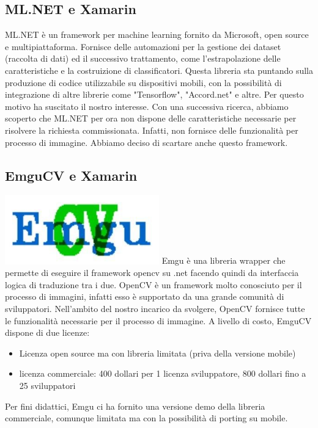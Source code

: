 \documentclass[twoside]{supsistudent}
\newcommand{\Decaa}{\newline\vspace{0.5mm}\newline\noindent}
\begin{document}
\subsection{ML.NET e Xamarin}
ML.NET è un framework per machine learning fornito da Microsoft, open source e multipiattaforma.
Fornisce delle automazioni per la gestione dei dataset (raccolta di dati) ed il successivo trattamento, come l'estrapolazione delle caratteristiche e la costruizione di classificatori.
\Decaa
Questa libreria sta puntando sulla produzione di codice utilizzabile su dispositivi mobili, con la possibilità di integrazione di altre librerie come "Tensorflow", "Accord.net" e altre. Per questo motivo ha suscitato il nostro interesse.
\Decaa
Con una successiva ricerca, abbiamo scoperto che ML.NET per ora non dispone delle caratteristiche necessarie per risolvere la richiesta commissionata. Infatti, non fornisce delle funzionalità per processo di immagine.
\Decaa
Abbiamo deciso di scartare anche questo framework.

\subsection{EmguCV e Xamarin}
\includegraphics[width=0.5\textwidth]{Pictures/emgu.jpeg}
\newline
Emgu è una libreria wrapper che permette di eseguire il framework opencv su .net facendo quindi da interfaccia logica di traduzione tra i due.
\Decaa
OpenCV è un framework molto conosciuto per il processo di immagini, infatti esso è supportato da una grande comunità di sviluppatori. Nell'ambito del nostro incarico da svolgere, OpenCV fornisce tutte le funzionalità necessarie per il processo di immagine.
\Decaa
A livello di costo, EmguCV dispone di due licenze:
\begin{itemize}
\item Licenza open source ma con libreria limitata (priva della versione mobile)
\item licenza commerciale: 400 dollari per 1 licenza sviluppatore, 800 dollari fino a 25 sviluppatori
\end{itemize}
Per fini didattici, Emgu ci ha fornito una versione demo della libreria commerciale, comunque limitata ma con la possibilità di porting su mobile.
\end{document}

